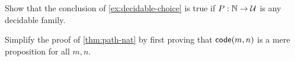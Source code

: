 \begin{ex}\label{ex:decidable-choice-strong}
  Show that the conclusion of \cref{ex:decidable-choice} is true if $P:\mathbb{N}\to\mathcal{U}$ is any decidable family.
\end{ex}

\begin{ex}\label{ex:n-set}
  Simplify the proof of \cref{thm:path-nat} by first proving that $\mathsf{code}(m,n)$ is a mere proposition for all $m,n$.
\end{ex}

